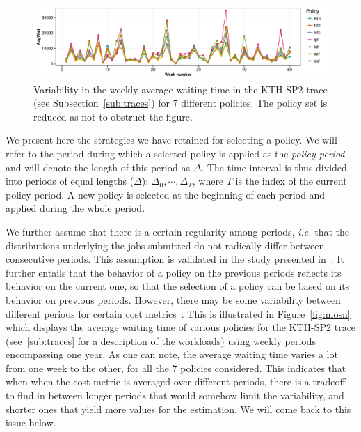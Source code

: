 \documentclass[sigconf,anonymous]{acmart}
\begin{document}
\begin{figure}[]
  \centering
  \includegraphics[scale=0.6]{figures/variability.pdf}

  \caption{Variability in the weekly average waiting time in the KTH-SP2 trace
  (see Subsection~\ref{sub:traces}) for 7 different policies. The policy set is
  reduced as not to obstruct the figure.}

  \label{fig:variability}
\end{figure}

We present here the strategies we have retained for selecting a policy. We will
refer to the period during which a selected policy is applied as the
\textit{policy period} and will denote the length of this period as $\Delta$.
The time interval is thus divided into periods of equal lengths ($\Delta$):
$\Delta_0, \cdots, \Delta_T$, where $T$ is the index of the current policy
period. A new policy is selected at the beginning of each period and applied
during the whole period.

We further assume that there is a certain regularity among periods,
\textit{i.e.} that the distributions underlying the jobs submitted do not
radically differ between consecutive periods. This assumption is validated in
the study presented in~\cite{jsspp17}. It further entails that the behavior of
a policy on the previous periods reflects its behavior on the current one, so
that the selection of a policy can be based on its behavior on previous
periods. However, there may be some variability between different periods for
certain cost metrics~\cite{feitelson2001metrics}. This is illustrated in
Figure~\ref{fig:mosn} which displays the average waiting time of various
policies for the KTH-SP2 trace (see~\ref{sub:traces} for a description of the
workloads) using weekly periods encompassing one year. As one can note, the
average waiting time varies a lot from one week to the other, for all the 7
policies considered. This indicates that when when the cost metric is averaged
over different periods, there is a tradeoff to find in between longer periods
that would somehow limit the variability, and shorter ones that yield more
values for the estimation. We will come back to this issue below.
\end{document}

